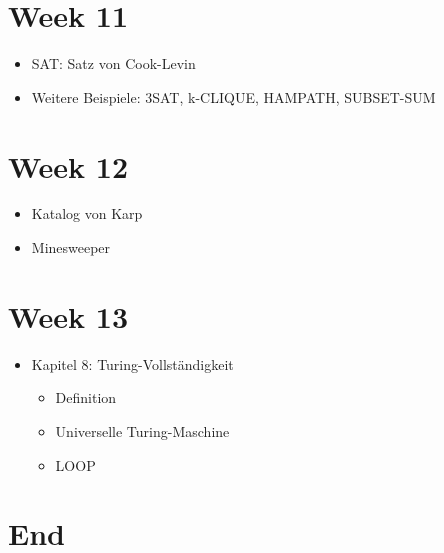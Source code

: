 \documentclass[11pt,twoside,landscape]{article}
\begin{document}
\begin{multicols}{3}
\section*{Week 11}
\label{sec:org27c02bb}
\begin{itemize}
\item SAT: Satz von Cook-Levin
\item Weitere Beispiele: 3SAT, k-CLIQUE, HAMPATH, SUBSET-SUM
\end{itemize}

\section*{Week 12}
\label{sec:orgc47098f}
\begin{itemize}
\item Katalog von Karp
\item Minesweeper
\end{itemize}
\section*{Week 13}
\label{sec:org6cdf95b}
\begin{itemize}
\item Kapitel 8: Turing-Vollständigkeit

\begin{itemize}
\item Definition
\item Universelle Turing-Maschine
\item LOOP
\end{itemize}
\end{itemize}



\section*{End}
\label{sec:orgfc3e60b}
\end{multicols}
\end{document}
